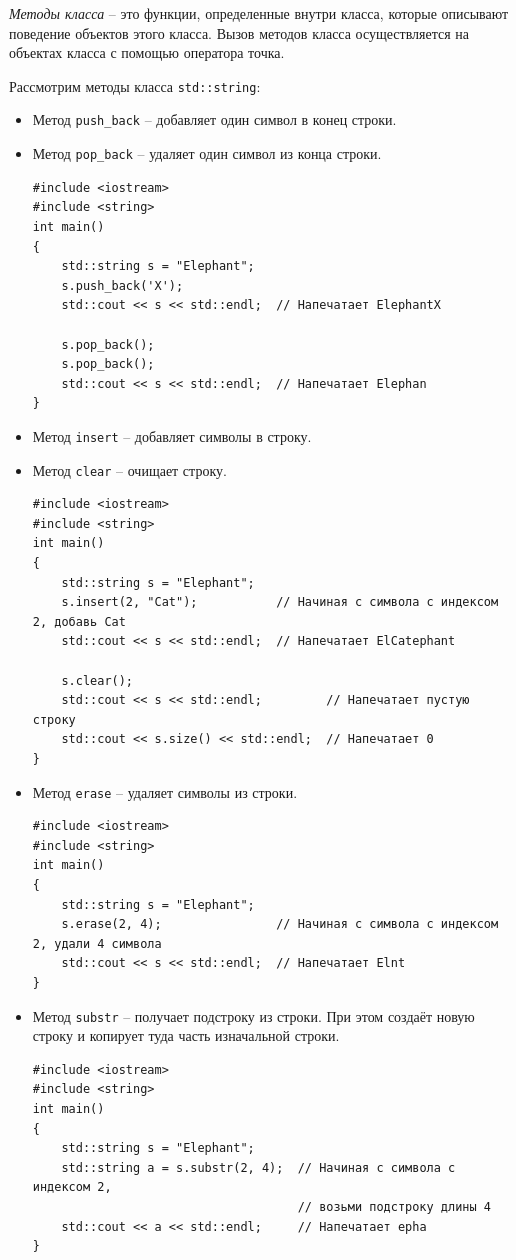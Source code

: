 \documentclass{article}
\begin{document}
\textit{Методы класса} -- это функции, определенные внутри класса, которые описывают поведение объектов этого класса. Вызов методов класса осуществляется на объектах класса с помощью оператора точка.

Рассмотрим методы класса \texttt{std::string}:
\begin{itemize}
\item Метод \texttt{push\_back} -- добавляет один символ в конец строки.
\item Метод \texttt{pop\_back} -- удаляет один символ из конца строки.
\begin{lstlisting}
#include <iostream>
#include <string>
int main()
{
    std::string s = "Elephant";
    s.push_back('X');
    std::cout << s << std::endl;  // Напечатает ElephantX
    
    s.pop_back();
    s.pop_back();
    std::cout << s << std::endl;  // Напечатает Elephan
}
\end{lstlisting}

\item Метод \texttt{insert} -- добавляет символы в строку.
\item Метод \texttt{clear} -- очищает строку.
\begin{lstlisting}
#include <iostream>
#include <string>
int main()
{
    std::string s = "Elephant";
    s.insert(2, "Cat");           // Начиная с символа с индексом 2, добавь Cat
    std::cout << s << std::endl;  // Напечатает ElCatephant
    
    s.clear();
    std::cout << s << std::endl;         // Напечатает пустую строку
    std::cout << s.size() << std::endl;  // Напечатает 0
}
\end{lstlisting}

\item Метод \texttt{erase} -- удаляет символы из строки.
\begin{lstlisting}
#include <iostream>
#include <string>
int main()
{
    std::string s = "Elephant";
    s.erase(2, 4);                // Начиная с символа с индексом 2, удали 4 символа
    std::cout << s << std::endl;  // Напечатает Elnt
}
\end{lstlisting}


\item Метод \texttt{substr} -- получает подстроку из строки. При этом создаёт новую строку и копирует туда часть изначальной строки.
\begin{lstlisting}
#include <iostream>
#include <string>
int main()
{
    std::string s = "Elephant";
    std::string a = s.substr(2, 4);  // Начиная с символа с индексом 2, 
                                     // возьми подстроку длины 4
    std::cout << a << std::endl;     // Напечатает epha
}
\end{lstlisting}



\end{itemize}
\end{document}
